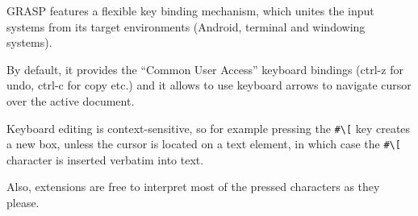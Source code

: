 \documentclass[sigconf]{acmart}
\begin{document}
GRASP features a flexible key binding mechanism,
which unites the input systems from its target
environments (Android, terminal and windowing
systems).

By default, it provides the ``Common User Access''
keyboard bindings (ctrl-z for undo, ctrl-c for copy
etc.) and it allows to use keyboard arrows to
navigate cursor over the active document.

Keyboard editing is context-sensitive, so
for example pressing the \texttt{\#\textbackslash[}
key creates a new box, unless the cursor is located on a text element,
in which case the \texttt{\#\textbackslash[} character is inserted verbatim
into text.

Also, extensions are free to interpret
most of the pressed characters as they please.








\end{document}
